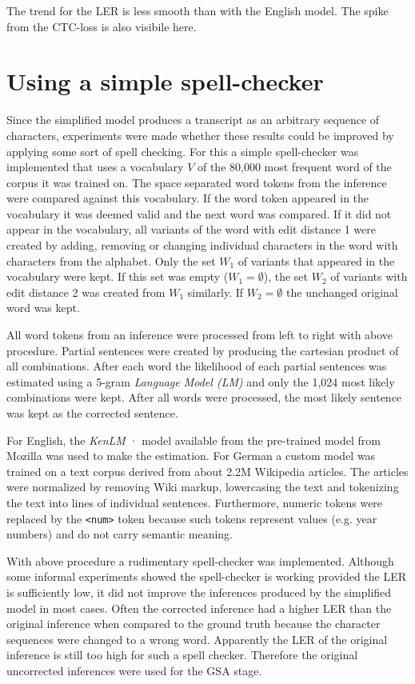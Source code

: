 \documentclass[letterpaper]{article}
\def\code#1{\texttt{#1}} %
\begin{document}
The trend for the LER is less smooth than with the English model. The spike from the CTC-loss is also visibile here.

\section{Using a simple spell-checker}

Since the simplified model produces a transcript as an arbitrary sequence of characters, experiments were made whether these results could be improved by applying some sort of spell checking. For this a simple spell-checker was implemented that uses a vocabulary $V$ of the 80,000 most frequent word of the corpus it was trained on. The space separated word tokens from the inference were compared against this vocabulary. If the word token appeared in the vocabulary it was deemed valid and the next word was compared. If it did not appear in the vocabulary, all variants of the word with edit distance 1 were created by adding, removing or changing individual characters in the word with characters from the alphabet. Only the set $W_1$  of variants that appeared in the vocabulary were kept. If this set was empty ($W_1 = \emptyset$), the set $W_2$ of variants with edit distance 2 was created from $W_1$ similarly. If $W_2 = \emptyset$ the unchanged original word was kept. 

All word tokens from an inference were processed from left to right with above procedure. Partial sentences were created by producing the cartesian product of all combinations. After each word the likelihood of each partial sentences was estimated using a 5-gram \textit{Language Model (LM)} and only the 1,024 most likely combinations were kept. After all words were processed, the most likely sentence was kept as the corrected sentence.

For English, the \textit{KenLM} ·\parencite{kenlm} model available from the pre-trained model from Mozilla was used to make the estimation. For German a custom model was trained on a text corpus derived from about 2.2M Wikipedia articles. The articles were normalized by removing Wiki markup, lowercasing the text and tokenizing the text into lines of individual sentences. Furthermore, numeric tokens were replaced by the \code{<num>} token because such tokens represent values (e.g. year numbers) and do not carry semantic meaning.

With above procedure a rudimentary spell-checker was implemented. Although some informal experiments showed the spell-checker is working provided the LER is sufficiently low, it did not improve the inferences produced by the simplified model in most cases. Often the corrected inference had a higher LER than the original inference when compared to the ground truth because the character sequences were changed to a wrong word. Apparently the LER of the original inference is still too high for such a spell checker. Therefore the original uncorrected inferences were used for the GSA stage.
\end{document}
